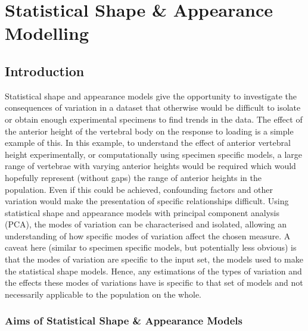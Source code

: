 \chapter{Statistical Shape \& Appearance Modelling}\label{PCA_CHAP}

\section{Introduction}

Statistical shape and appearance models give the opportunity to investigate the
consequences of variation in a dataset that otherwise would be difficult to
isolate or obtain enough experimental specimens to find trends in the data.
The effect of the anterior height of the vertebral body on the response to
loading is a simple example of this. In this example, to understand the effect
of anterior vertebral height experimentally, or computationally using specimen
specific models, a large range of vertebrae with varying anterior heights would
be required which would hopefully represent (without gaps) the range of
anterior heights in the population. Even if this could be achieved, confounding
factors and other variation would make the presentation of specific
relationships difficult. Using statistical shape and appearance models with
principal component analysis (PCA), the modes of variation can be characterised
and isolated, allowing an understanding of how specific modes of variation
affect the chosen measure. A caveat here (similar to specimen specific models,
but potentially less obvious) is that the modes of variation are specific to
the input set, the models used to make the statistical shape models. Hence, any
estimations of the types of variation and the effects these modes of variations
have is specific to that set of models and not necessarily applicable to the
population on the whole.



\subsection{Aims of Statistical Shape \& Appearance Models}

